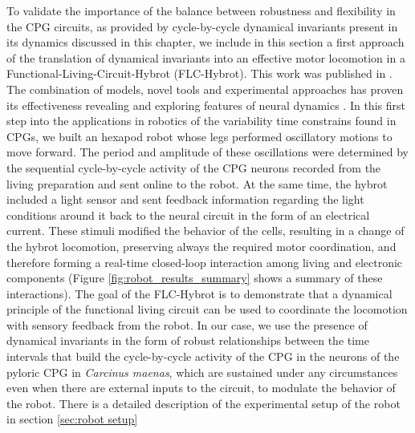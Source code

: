 To validate the importance of the balance between robustness and flexibility in the CPG circuits, as provided by cycle-by-cycle dynamical invariants present in its dynamics discussed in this chapter, we include in this section a first approach of the translation of dynamical invariants into an effective motor locomotion in a Functional-Living-Circuit-Hybrot (FLC-Hybrot). This work was published in \textcite{amaducci_hybrid_2020,amaducci_controlling_2021}. The combination of models, novel tools and experimental approaches has proven its effectiveness revealing and exploring features of neural dynamics \parencite{szucs_interacting_2000,chamorro_generalization_2012,reyes-sanchez_automatized_2023}. In this first step into the applications in robotics of the variability time constrains found in CPGs, we built an hexapod robot whose legs performed oscillatory motions to move forward. The period and amplitude of these oscillations were determined by the sequential cycle-by-cycle activity of the CPG neurons recorded from the living preparation and sent online to the robot. At the same time, the hybrot included a light sensor and sent feedback information regarding the light conditions around it back to the neural circuit in the form of an electrical current. These stimuli modified the behavior of the cells, resulting in a change of the hybrot locomotion, preserving always the required motor coordination, and therefore forming a real-time closed-loop interaction among living and electronic components (Figure \ref{fig:robot_results_summary} shows a summary of these interactions). The goal of the FLC-Hybrot is to demonstrate that a dynamical principle of the functional living circuit can be used to coordinate the locomotion with sensory feedback from the robot. In our case, we use the presence of dynamical invariants in the form of robust relationships between the time intervals that build the cycle-by-cycle activity of the CPG in the neurons of the pyloric CPG in \textit{Carcinus maenas}, which are sustained under any circumstances even when there are external inputs to the circuit, to modulate the behavior of the robot. There is a detailed description of the experimental setup of the robot in section \ref{sec:robot setup}


